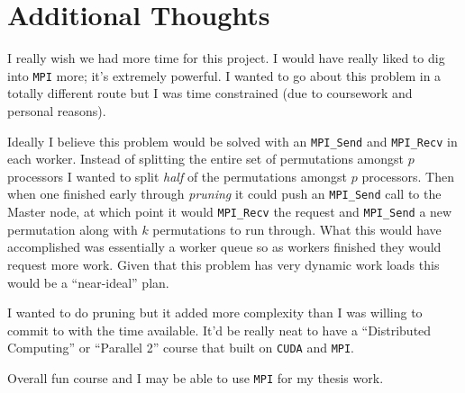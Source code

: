 \documentclass{article}
\begin{document}
\section{Additional Thoughts}
I really wish we had more time for this project. I would have really liked to 
dig into \verb|MPI| more; it's extremely powerful. I wanted to go about this 
problem in a totally different route but I was time constrained (due to 
coursework and personal reasons). 

Ideally I believe this problem would be solved with an \verb|MPI_Send| and 
\verb|MPI_Recv| in each worker. Instead of splitting the entire set of 
permutations amongst $p$ processors I wanted to split \textit{half} of the 
permutations amongst $p$ processors. Then when one finished early through 
\textit{pruning} it could push an \verb|MPI_Send| call to the Master node, at 
which point it would \verb|MPI_Recv| the request and \verb|MPI_Send| a new 
permutation along with $k$ permutations to run through. What this would have 
accomplished was essentially a worker queue so as workers finished they would 
request more work. Given that this problem has very dynamic work loads this 
would be a ``near-ideal'' plan.

I wanted to do pruning but it added more complexity than I was willing to commit 
to with the time available. It'd be really neat to have a 
``Distributed Computing'' or ``Parallel 2'' course that built on \verb|CUDA| and 
\verb|MPI|.

Overall fun course and I may be able to use \verb|MPI| for my thesis work.
\end{document}
